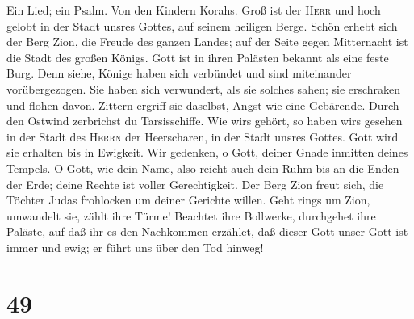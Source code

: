  Ein Lied; ein Psalm. Von den Kindern Korahs. Groß ist der
\textsc{Herr} und hoch gelobt in der Stadt unsres Gottes, auf seinem
heiligen Berge.  Schön erhebt sich der Berg Zion, die
Freude des ganzen Landes; auf der Seite gegen Mitternacht ist die Stadt
des großen Königs.  Gott ist in ihren Palästen bekannt als
eine feste Burg.  Denn siehe, Könige haben sich verbündet
und sind miteinander vorübergezogen.  Sie haben sich
verwundert, als sie solches sahen; sie erschraken und flohen davon.
 Zittern ergriff sie daselbst, Angst wie eine Gebärende.
 Durch den Ostwind zerbrichst du Tarsisschiffe.
 Wie wir\textquotesingle s gehört, so haben
wir\textquotesingle s gesehen in der Stadt des \textsc{Herrn} der
Heerscharen, in der Stadt unsres Gottes. Gott wird sie erhalten bis in
Ewigkeit.  Wir gedenken, o Gott, deiner Gnade inmitten
deines Tempels.  O Gott, wie dein Name, also reicht auch
dein Ruhm bis an die Enden der Erde; deine Rechte ist voller
Gerechtigkeit.  Der Berg Zion freut sich, die Töchter
Judas frohlocken um deiner Gerichte willen.  Geht rings
um Zion, umwandelt sie, zählt ihre Türme!  Beachtet ihre
Bollwerke, durchgehet ihre Paläste, auf daß ihr es den Nachkommen
erzählet,  daß dieser Gott unser Gott ist immer und ewig;
er führt uns über den Tod hinweg!

\hypertarget{section-48}{%
\section{49}\label{section-48}}

